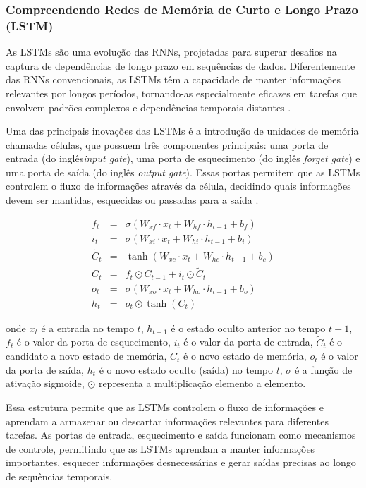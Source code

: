  \subsubsection{Compreendendo Redes de Mem\'oria de Curto e Longo Prazo (LSTM)}
 
 As LSTMs são uma evolução das RNNs, projetadas para superar desafios na captura de dependências de longo prazo em sequências de dados. Diferentemente das RNNs convencionais, as LSTMs têm a capacidade de manter informações relevantes por longos períodos, tornando-as especialmente eficazes em tarefas que envolvem padrões complexos e dependências temporais distantes \cite{Zhang2021}.
 
 Uma das principais inovações das LSTMs é a introdução de unidades de memória chamadas células, que possuem três componentes principais: uma porta de entrada (do inglês\textit{input gate}), uma porta de esquecimento (do inglês \textit{forget gate}) e uma porta de saída (do inglês \textit{output gate}). Essas portas permitem que as LSTMs controlem o fluxo de informações através da célula, decidindo quais informações devem ser mantidas, esquecidas ou passadas para a saída \cite{Zhang2021}.
 
 
 
 \begin{eqnarray}
 	f_t &=& \sigma(W_{xf} \cdot x_t + W_{hf} \cdot h_{t-1} + b_f) \\
 	i_t &=& \sigma(W_{xi} \cdot x_t + W_{hi} \cdot h_{t-1} + b_i) \\
 	\tilde{C}_t &=& \tanh(W_{xc} \cdot x_t + W_{hc} \cdot h_{t-1} + b_c) \\
 	C_t &=& f_t \odot C_{t-1} + i_t \odot \tilde{C}_t \\
 	o_t &=& \sigma(W_{xo} \cdot x_t + W_{ho} \cdot h_{t-1} + b_o) \\
 	h_t &=& o_t \odot \tanh(C_t)
 \end{eqnarray}
 
 
 \noindent onde \(x_t\) é a entrada no tempo \(t\), \(h_{t-1}\) é o estado oculto anterior no tempo \(t-1\), \(f_t\) é o valor da porta de esquecimento, \(i_t\) é o valor da porta de entrada, \(\tilde{C}_t\) é o candidato a novo estado de memória, \(C_t\) é o novo estado de memória, \(o_t\) é o valor da porta de saída, \(h_t\) é o novo estado oculto (saída) no tempo \(t\), \(\sigma\) é a função de ativação sigmoide, \(\odot\) representa a multiplicação elemento a elemento.
 
 Essa estrutura permite que as LSTMs controlem o fluxo de informações e aprendam a armazenar ou descartar informações relevantes para diferentes tarefas. As portas de entrada, esquecimento e saída funcionam como mecanismos de controle, permitindo que as LSTMs aprendam a manter informações importantes, esquecer informações desnecessárias e gerar saídas precisas ao longo de sequências temporais.
 
